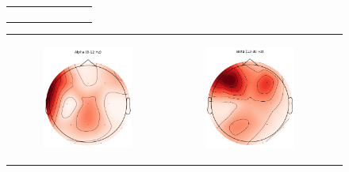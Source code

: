 \begin{figure}[!ht]
\begin{tabular}{cc}
\begin{subfigure}[c]{0.3\textwidth}
            \caption{}
        \end{subfigure}
    \end{tabular}
    \vspace{\abovecaptionskip}
    \begin{tabular}{ccc}
        \begin{subfigure}[c]{0.3\textwidth}
            \centering
            \includegraphics{images/topomap_alpha_colored.png}
            \caption{}
        \end{subfigure}
        &
        \begin{subfigure}[c]{0.3\textwidth}
            \centering
            \includegraphics{images/topomap_beta_colored.png}

\end{subfigure}
\end{tabular}
\end{figure}
